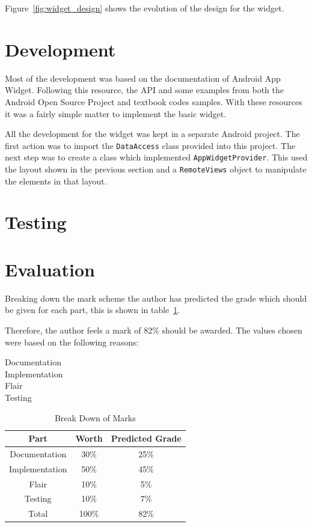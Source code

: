 \documentclass[11pt, a4paper]{article}
\begin{document}
Figure~\ref{fig:widget_design} shows the evolution of the design for the 
widget.


\section{Development}

Most of the development was based on the documentation of Android App 
Widget\cite{google2013appwidgets}. Following this resource, the API and some 
examples from both the Android Open Source Project and textbook codes 
samples\cite{murphy2009android}. With these resources it was a fairly simple 
matter to implement the basic widget.

All the development for the widget was kept in a separate Android project. The
first action was to import the \texttt{DataAccess} class provided into this 
project. The next step was to create a class which implemented 
\texttt{AppWidgetProvider}. This used the layout shown in the previous section
and a \texttt{RemoteViews} object to manipulate the elements in that layout.


\section{Testing}


\section{Evaluation}


Breaking down the mark scheme the author has predicted the grade which should 
be given for each part, this is shown in table~\ref{tab:marks}.

Therefore, the author feels a mark of 82\% should be awarded. The values chosen 
were based on the following reasons:

\begin{description}
\item[Documentation] 
\item[Implementation] 
\item[Flair] 
\item[Testing] 
\end{description}

\begin{table}[h]
\centering
\begin{tabular}{|c|c|c|}\hline
\textbf{Part} & \textbf{Worth} & \textbf{Predicted Grade} \\ \hline
Documentation & 30\% & 25\% \\ 
Implementation & 50\% & 45\% \\ 
Flair & 10\% & 5\% \\ 
Testing & 10\% & 7\% \\ \hline
Total & 100\% & 82\% \\ \hline
\end{tabular}
\caption{Break Down of Marks}\label{tab:marks}
\end{table}

\newpage



\end{document}
